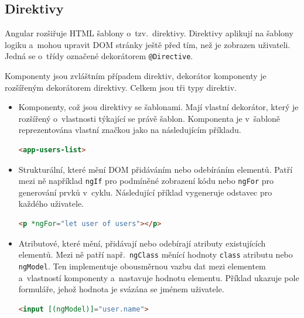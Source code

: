 \documentclass[
  digital, %
  oneside, %
  table,   %
  nolof,     %
  nolot,     %
  nocover
]{fithesis3}
\begin{document}
\subsection{Direktivy}
Angular rozšiřuje HTML šablony o~tzv.~direktivy. Direktivy aplikují na šablony logiku a~mohou upravit DOM stránky ještě před tím, než je zobrazen uživateli. Jedná se o~třídy označené dekorátorem \verb|@Directive|.\par
Komponenty jsou zvláštním případem direktiv, dekorátor komponenty je rozšířeným dekorátorem direktivy. Celkem jsou tři typy direktiv. \cite{angulario}
\begin{itemize}
  \item Komponenty, což jsou direktivy se šablonami. Mají vlastní dekorátor, který je rozšířený o~vlastnosti týkající se právě šablon. Komponenta je v~šabloně reprezentována vlastní značkou jako na následujícím příkladu.
\begin{lstlisting}[showstringspaces=false,language=html]
<app-users-list>
\end{lstlisting}
  \item Strukturální, které mění DOM přidáváním nebo odebíráním elementů. Patří mezi ně například \verb|ngIf| pro podmíněné zobrazení kódu nebo \verb|ngFor| pro generování prvků v~cyklu. Následující příklad vygeneruje odstavec pro každého uživatele.
\begin{lstlisting}[showstringspaces=false,language=html]
<p *ngFor="let user of users"></p>
\end{lstlisting}
  \item Atributové, které mění, přidávají nebo odebírají atributy existujících elementů. Mezi ně patří např.~\verb|ngClass| měnící hodnoty \verb|class| atributu nebo \verb|ngModel|. Ten implementuje obousměrnou vazbu dat mezi elementem a~vlastností komponenty a~nastavuje hodnotu elementu. Příklad ukazuje pole formuláře, jehož hodnota je svázána se jménem uživatele.
\begin{lstlisting}[showstringspaces=false,language=html]
<input [(ngModel)]="user.name">
\end{lstlisting}
\end{itemize}
\end{document}
